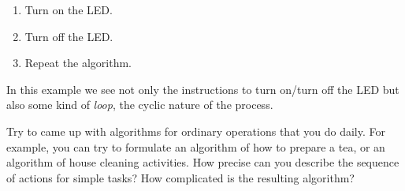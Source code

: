 \documentclass[../sparc.tex]{subfiles}
\begin{document}
\begin{enumerate}
\item Turn on the LED.
\item Turn off the LED.
\item Repeat the algorithm.
\end{enumerate}

In this example we see not only the instructions to turn on/turn off the LED but
also some kind of \emph{loop}, the cyclic nature of the process.

 { Try to came up with algorithms for ordinary operations that you
  do daily.  For example, you can try to formulate an algorithm of how to
  prepare a tea, or an algorithm of house cleaning activities.  How precise can
  you describe the sequence of actions for simple tasks?  How complicated is the
  resulting algorithm? }
\end{document}
